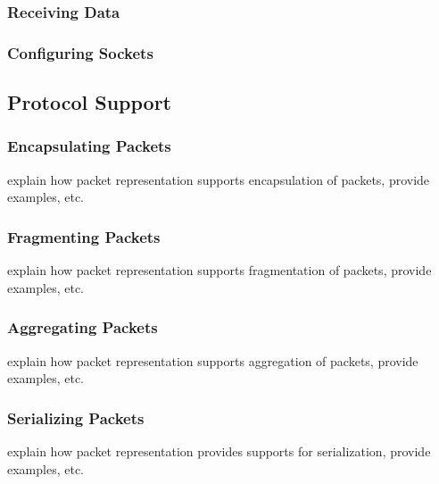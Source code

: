 %
\subsubsection*{Receiving Data}
%

%
\subsubsection*{Configuring Sockets}
%

%
\subsection{Protocol Support}
\label{subsec:protocol-support}
%


%
\subsubsection*{Encapsulating Packets}
%
explain how \inet packet representation supports encapsulation of packets, provide examples, etc.



%
\subsubsection*{Fragmenting Packets}
%
explain how \inet packet representation supports fragmentation of packets, provide examples, etc.



%
\subsubsection*{Aggregating Packets}
%
explain how \inet packet representation supports aggregation of packets, provide examples, etc.



%
\subsubsection*{Serializing Packets}
%
explain how \inet packet representation provides supports for serialization, provide examples, etc.

